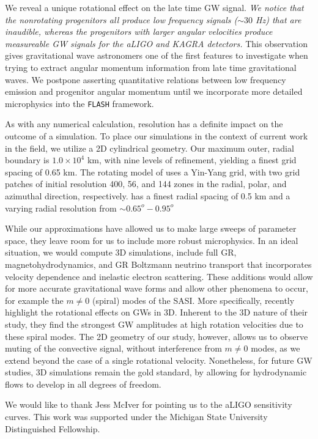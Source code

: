 \documentclass[twocolumn,times]{aastex62}  %
\begin{document}
We reveal a unique rotational effect on the late time GW signal.  \textit{We notice that the nonrotating progenitors all produce low frequency signals ($\sim 30$ Hz) that are inaudible, whereas the progenitors with larger angular velocities produce measureable GW signals for the aLIGO and KAGRA detectors.}  This observation gives gravitational wave astronomers one of the first features to investigate when trying to extract angular momentum information from late time gravitational waves.  We postpone asserting quantitative relations between low frequency emission and progenitor angular momentum until we incorporate more detailed microphysics into the \texttt{FLASH} framework.

As with any numerical calculation, resolution has a definite impact on the outcome of a simulation.  To place our simulations in the context of current work in the field, we utilize a 2D cylindrical geometry.  Our maximum outer, radial boundary is $1.0 \times 10^4$ km, with nine levels of refinement, yielding a finest grid spacing of 0.65 km.  The rotating model of \citet{andresen:2018} uses a Yin-Yang grid, with two grid patches of initial resolution  400, 56, and 144 zones in the radial, polar, and azimuthal direction, respectively.  \citet{morozova:2018}  has a finest radial spacing of 0.5 km and a varying radial resolution from $\sim 0.65^o-0.95^o$

While our approximations have allowed us to make large sweeps of parameter space, they leave room for us to include more robust microphysics.  In an ideal situation, we would compute 3D simulations, include full GR, magnetohydrodynamics, and GR Boltzmann neutrino transport that incorporates velocity dependence and inelastic electron scattering.  These additions would allow for more accurate gravitational wave forms and allow other phenomena to occur, for example the $m\ne 0$ (spiral) modes of the SASI.  More specifically, \citet{andresen:2018} recently highlight the rotational effects on GWs in 3D.  Inherent to the 3D nature of their study, they find the strongest GW amplitudes at high rotation velocities due to these spiral modes.  The 2D geometry of our study, however, allows us to observe muting of the convective signal, without interference from $m\ne 0$ modes, as we extend beyond the case of a single rotational velocity.  Nonetheless, for future GW studies, 3D simulations remain the gold standard, by allowing for hydrodynamic flows to develop in all degrees of freedom. 

\acknowledgements

We would like to thank Jess McIver for pointing us to the aLIGO sensitivity curves.  This work was supported under the Michigan State University Distinguished Fellowship. 

    





\end{document}
